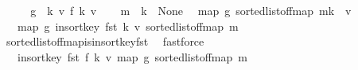 \begin{isabellebody}
%
\isadelimproof
%
\endisadelimproof
%
\isatagproof
{}\isamarkupfalse%
\ {\isacharminus}{\kern0pt}\isanewline
\ \ \isamarkupfalse%
\ {\isacharquery}{\kern0pt}g\ {\isacharequal}{\kern0pt}\ {\isachardoublequoteopen}{\isacharparenleft}{\kern0pt}{\isasymlambda}{\isacharparenleft}{\kern0pt}k{\isacharcomma}{\kern0pt}\ v{\isacharparenright}{\kern0pt}{\isachardot}{\kern0pt}\ {\isacharparenleft}{\kern0pt}f\ k{\isacharcomma}{\kern0pt}\ v{\isacharparenright}{\kern0pt}{\isacharparenright}{\kern0pt}{\isachardoublequoteclose}\isanewline
\ \ \isamarkupfalse%
\ {\isacartoucheopen}m\ {\isachardollar}{\kern0pt}{\isachardollar}{\kern0pt}\ k\ {\isacharequal}{\kern0pt}\ None{\isacartoucheclose}\ \isamarkupfalse%
\ {\isachardoublequoteopen}map\ {\isacharquery}{\kern0pt}g\ {\isacharparenleft}{\kern0pt}sorted{\isacharunderscore}{\kern0pt}list{\isacharunderscore}{\kern0pt}of{\isacharunderscore}{\kern0pt}fmap\ {\isacharparenleft}{\kern0pt}m{\isacharparenleft}{\kern0pt}k\ {\isachardollar}{\kern0pt}{\isachardollar}{\kern0pt}{\isacharcolon}{\kern0pt}{\isacharequal}{\kern0pt}\ v{\isacharparenright}{\kern0pt}{\isacharparenright}{\kern0pt}{\isacharparenright}{\kern0pt}\ {\isacharequal}{\kern0pt}\isanewline
\ \ \ map\ {\isacharquery}{\kern0pt}g\ {\isacharparenleft}{\kern0pt}insort{\isacharunderscore}{\kern0pt}key\ fst\ {\isacharparenleft}{\kern0pt}k{\isacharcomma}{\kern0pt}\ v{\isacharparenright}{\kern0pt}\ {\isacharparenleft}{\kern0pt}sorted{\isacharunderscore}{\kern0pt}list{\isacharunderscore}{\kern0pt}of{\isacharunderscore}{\kern0pt}fmap\ m{\isacharparenright}{\kern0pt}{\isacharparenright}{\kern0pt}{\isachardoublequoteclose}\isanewline
\ \ \ \isamarkupfalse%
\ sorted{\isacharunderscore}{\kern0pt}list{\isacharunderscore}{\kern0pt}of{\isacharunderscore}{\kern0pt}fmap{\isacharunderscore}{\kern0pt}is{\isacharunderscore}{\kern0pt}insort{\isacharunderscore}{\kern0pt}key{\isacharunderscore}{\kern0pt}fst\ \isamarkupfalse%
\ fastforce\isanewline
\ \ \isamarkupfalse%
\ \isamarkupfalse%
\ {\isachardoublequoteopen}{\isasymdots}\ {\isacharequal}{\kern0pt}\ insort{\isacharunderscore}{\kern0pt}key\ fst\ {\isacharparenleft}{\kern0pt}f\ k{\isacharcomma}{\kern0pt}\ v{\isacharparenright}{\kern0pt}\ {\isacharparenleft}{\kern0pt}map\ {\isacharquery}{\kern0pt}g\ {\isacharparenleft}{\kern0pt}sorted{\isacharunderscore}{\kern0pt}list{\isacharunderscore}{\kern0pt}of{\isacharunderscore}{\kern0pt}fmap\ m{\isacharparenright}{\kern0pt}{\isacharparenright}{\kern0pt}{\isachardoublequoteclose}\isanewline

\end{isabellebody}
